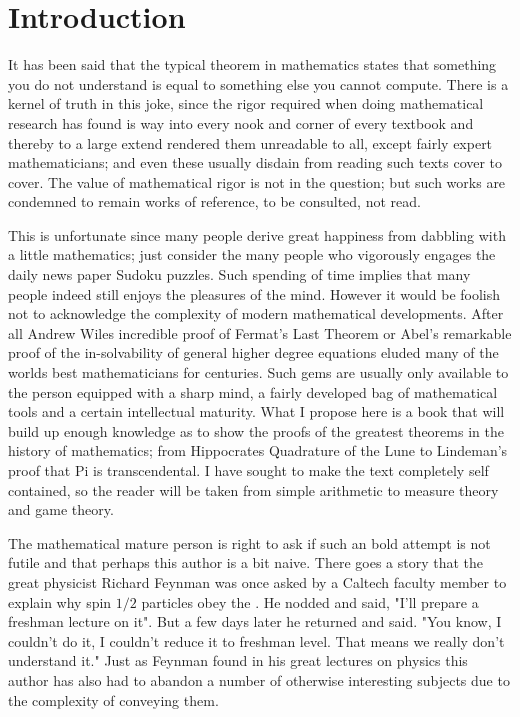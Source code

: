\chapter{Introduction}
It has been said that the typical theorem in mathematics states that something you do not understand is equal to something else you cannot compute. There is a kernel of truth in this joke, since the rigor required when doing mathematical research has found is way into every nook and corner of every textbook and thereby to a large extend rendered them unreadable to all, except fairly expert mathematicians; and even these usually disdain from reading such texts cover to cover. The value of mathematical rigor is not in the question; but such works are condemned to remain works of reference, to be consulted, not read.

This is unfortunate since many people derive great happiness from dabbling with a little mathematics; just consider the many people who vigorously engages the daily news paper Sudoku puzzles. Such spending of time implies that many people indeed still enjoys the pleasures of the mind. However it would be foolish not to acknowledge the complexity of modern mathematical developments. After all Andrew Wiles incredible proof of Fermat's Last Theorem or Abel's remarkable proof of the in-solvability of general higher degree equations eluded many of the worlds best mathematicians for centuries. Such gems are usually only available to the person equipped with a sharp mind, a fairly developed bag of mathematical tools and a certain intellectual maturity. What I propose here is a book that will build up enough knowledge as to show the proofs of the greatest theorems in the history of mathematics; from Hippocrates Quadrature of the Lune to Lindeman's proof that Pi is transcendental. I have sought to make the text completely self contained, so the reader will be taken from simple arithmetic to measure theory and game theory.

The mathematical mature person is right to ask if such an bold attempt is not futile and that perhaps this author is a bit naive. There goes a story that the great physicist Richard Feynman was once asked by a Caltech faculty member to explain why spin $1/2$ particles obey the . He nodded and said, "I'll prepare a freshman lecture on it". But a few days later he returned and said. "You know, I couldn't do it, I couldn't reduce it to freshman level. That means we really don't understand it." Just as Feynman found in his great lectures on physics this author has also had to abandon a number of otherwise interesting subjects due to the complexity of conveying them.

